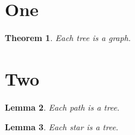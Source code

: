 \documentclass[aip,preprint]{revtex4-1}
\newtheorem{theorem}{Theorem}[section]
\newtheorem{lemma}[theorem]{Lemma}
\begin{document}
\section{One}
\begin{theorem} Each tree is a graph. \end{theorem}
\section{Two}
\begin{lemma} Each path is a tree. \end{lemma}
\begin{lemma} Each star is a tree. \end{lemma}
\end{document}
